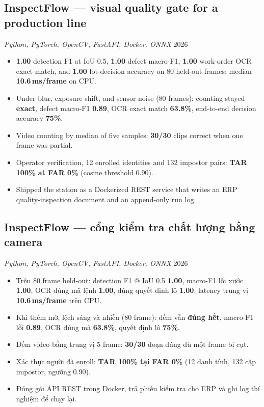 
\subsection{InspectFlow --- visual quality gate for a production line}
\textit{Python, PyTorch, OpenCV, FastAPI, Docker, ONNX} \hfill 2026
\begin{itemize}[leftmargin=*, nosep]
  \item \textbf{1.00} detection F1 at IoU 0.5, \textbf{1.00} defect macro-F1, \textbf{1.00} work-order OCR exact match, and \textbf{1.00} lot-decision accuracy on 80 held-out frames; median \textbf{10.6\,ms/frame} on CPU.
  \item Under blur, exposure shift, and sensor noise (80 frames): counting stayed \textbf{exact}, defect macro-F1 \textbf{0.89}, OCR exact match \textbf{63.8\%}, end-to-end decision accuracy \textbf{75\%}.
  \item Video counting by median of five samples: \textbf{30/30} clips correct when one frame was partial.
  \item Operator verification, 12 enrolled identities and 132 impostor pairs: \textbf{TAR 100\% at FAR 0\%} (cosine threshold 0.90).
  \item Shipped the station as a Dockerized REST service that writes an ERP quality-inspection document and an append-only run log.
\end{itemize}

\subsection{InspectFlow --- cổng kiểm tra chất lượng bằng camera}
\textit{Python, PyTorch, OpenCV, FastAPI, Docker, ONNX} \hfill 2026
\begin{itemize}[leftmargin=*, nosep]
  \item Trên 80 frame held-out: detection F1 @ IoU 0.5 \textbf{1.00}, macro-F1 lỗi xước \textbf{1.00}, OCR đúng mã lệnh \textbf{1.00}, đúng quyết định lô \textbf{1.00}; latency trung vị \textbf{10.6\,ms/frame} trên CPU.
  \item Khi thêm mờ, lệch sáng và nhiễu (80 frame): đếm vẫn \textbf{đúng hết}, macro-F1 lỗi \textbf{0.89}, OCR đúng mã \textbf{63.8\%}, quyết định lô \textbf{75\%}.
  \item Đếm video bằng trung vị 5 frame: \textbf{30/30} đoạn đúng dù một frame bị cụt.
  \item Xác thực người đã enroll: \textbf{TAR 100\% tại FAR 0\%} (12 danh tính, 132 cặp impostor, ngưỡng 0.90).
  \item Đóng gói API REST trong Docker, trả phiếu kiểm tra cho ERP và ghi log thí nghiệm để chạy lại.
\end{itemize}
